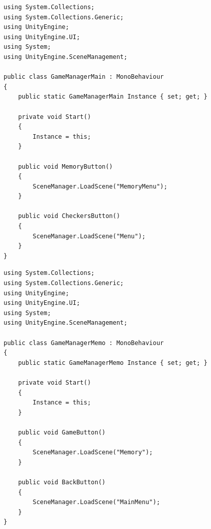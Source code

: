 \documentclass[12pt]{article}
\begin{document}
\begin{lstlisting}[language={[Sharp]C}, caption={GameManagerMain.cs}, label={GameManagerMainScript}]
using System.Collections;
using System.Collections.Generic;
using UnityEngine;
using UnityEngine.UI;
using System;
using UnityEngine.SceneManagement;

public class GameManagerMain : MonoBehaviour
{
	public static GameManagerMain Instance { set; get; }
	
	private void Start()
	{
		Instance = this;
	}
	
	public void MemoryButton()
	{
		SceneManager.LoadScene("MemoryMenu");
	}
	
	public void CheckersButton()
	{
		SceneManager.LoadScene("Menu");
	}
}
\end{lstlisting}

\begin{lstlisting}[language={[Sharp]C}, caption={GameManagerMemo.cs}, label={GameManagerMemoScript}]
using System.Collections;
using System.Collections.Generic;
using UnityEngine;
using UnityEngine.UI;
using System;
using UnityEngine.SceneManagement;

public class GameManagerMemo : MonoBehaviour
{
	public static GameManagerMemo Instance { set; get; }
	
	private void Start()
	{
		Instance = this;
	}
	
	public void GameButton()
	{
		SceneManager.LoadScene("Memory");
	}
	
	public void BackButton()
	{
		SceneManager.LoadScene("MainMenu");
	}
}

\end{lstlisting}
\end{document}
